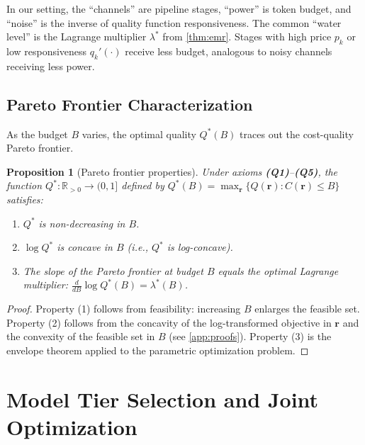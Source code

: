 \documentclass[11pt, a4paper, copyright]{googledeepmind}
\newtheorem{proposition}{Proposition}[section]
\begin{document}
In our setting, the ``channels'' are pipeline stages, ``power'' is token budget, and ``noise'' is the inverse of quality function responsiveness. The common ``water level'' is the Lagrange multiplier $\lambda^*$ from \cref{thm:emr}. Stages with high price $p_k$ or low responsiveness $q_k'(\cdot)$ receive less budget, analogous to noisy channels receiving less power.

\subsection{Pareto Frontier Characterization}

As the budget $B$ varies, the optimal quality $Q^*(B)$ traces out the cost-quality Pareto frontier.

\begin{proposition}[Pareto frontier properties]\label{prop:pareto}
Under axioms \textbf{(Q1)}--\textbf{(Q5)}, the function $Q^*: \mathbb{R}_{>0} \to (0,1]$ defined by $Q^*(B) = \max_{\mathbf{r}} \{Q(\mathbf{r}) : C(\mathbf{r}) \leq B\}$ satisfies:
\begin{enumerate}[nosep]
    \item $Q^*$ is non-decreasing in $B$.
    \item $\log Q^*$ is concave in $B$ (i.e., $Q^*$ is log-concave).
    \item The slope of the Pareto frontier at budget $B$ equals the optimal Lagrange multiplier: $\frac{d}{dB}\log Q^*(B) = \lambda^*(B)$.
\end{enumerate}
\end{proposition}

\begin{proof}
Property (1) follows from feasibility: increasing $B$ enlarges the feasible set. Property (2) follows from the concavity of the log-transformed objective in $\mathbf{r}$ and the convexity of the feasible set in $B$ (see \cref{app:proofs}). Property (3) is the envelope theorem applied to the parametric optimization problem.
\end{proof}


\section{Model Tier Selection and Joint Optimization}\label{sec:mtsp}
\end{document}
